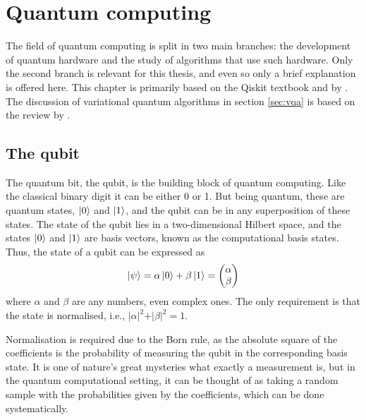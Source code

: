\chapter{Quantum computing}
\label{chap:quantum}
The field of quantum computing is split in two main branches: the development of quantum hardware and the study of algorithms that use such hardware.
Only the second branch is relevant for this thesis, and even so only a brief explanation is offered here.
This chapter is primarily based on the Qiskit textbook \cite{qiskit_textbook} and  by \textcite{textbook_2nd}.
The discussion of variational quantum algorithms in section \ref{sec:vqa} is based on the review by \textcite{cerezo2021}.
\section{The qubit}
The quantum bit, the qubit, is the building block of quantum computing.
Like the classical binary digit it can be either 0 or 1.
But being quantum, these are quantum states, $\ket{0}$ and $\ket{1}$, and the qubit can be in any superposition of these states.
The state of the qubit lies in a two-dimensional Hilbert space, and the states $\ket{0}$ and $\ket{1}$ are basis vectors, known as the computational basis states.
Thus, the state of a qubit can be expressed as
\begin{equation}
  \ket{\psi} = \alpha \ket{0} + \beta \ket{1} = \begin{pmatrix} \alpha \\ \beta \end{pmatrix}
  \label{eq:qubit}
\end{equation}
where $\alpha$ and $\beta$ are any numbers, even complex ones.
The only requirement is that the state is normalised, i.e., $\vert\alpha\vert^2 + \vert\beta\vert^2 = 1$.

Normalisation is required due to the Born rule, as the absolute square of the coefficients is the probability of measuring the qubit in the corresponding basis state.
It is one of nature's great mysteries what exactly a measurement is, but in the quantum computational setting, it can be thought of as taking a random sample with the probabilities given by the coefficients, which can be done systematically.

